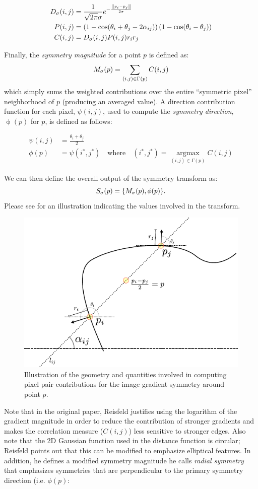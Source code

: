 \begin{align}
D_\sigma(i,j) &= \frac{1}{\sqrt{2\pi}\sigma}e^{-\frac{\left\lVert p_i - p_j \right\rVert}{2\sigma}} \label{eq:dist} \\
P(i,j)        &= \left(1 - \cos(\theta_i + \theta_j - 2\alpha_{ij})\right)\left(1 - \cos(\theta_i - \theta_j)\right) \label{eq:phase}\\
C(i,j)        &= D_\sigma(i,j)P(i,j)r_i r_j \label{eq:cont}
\end{align}

Finally, the \emph{symmetry magnitude} for a point \(p\) is defined as:
\[ M_\sigma(p) = \sum_{(i,j) \in \Gamma(p)} C(i,j) \] which simply sums the weighted contributions over the entire ``symmetric pixel'' neighborhood of \(p\) (producing an averaged value). A direction contribution function for each pixel, \(\psi(i,j)\), used to compute the \emph{symmetry direction}, \(\operatorname{\phi}(p)\) for \(p\), is defined as follows:

\begin{align}
\psi(i,j) &= \frac{\theta_i + \theta_j}{2} \\
\phi(p)   &= \psi(i^*,j^*)\quad\mathrm{where}\quad(i^*,j^*) = \operatorname*{argmax}_{(i,j) \in \Gamma(p)} C(i,j)
\end{align} 

We can then define the overall output of the symmetry transform as:
\[S_\sigma(p) = \{M_\sigma(p), \phi(p)\}.\] Please see  for an illustration indicating the values involved in the transform.

\begin{figure}[ht]
\centering
\includegraphics[width=0.6\linewidth]{figures/pixel_contributions.pdf}
\caption{\label{fig:pixel-contr}
Illustration of the geometry and quantities involved in computing pixel pair contributions for the image gradient symmetry around point \(p\).}
\end{figure}

Note that in the original paper, Reisfeld justifies using the logarithm of the gradient magnitude in order to reduce the contribution of stronger gradients and makes the correlation measure (\(C(i,j)\)) less sensitive to stronger edges. Also note that the 2D Gaussian function used in the distance function is circular; Reisfeld points out that this can be modified to emphasize elliptical features. In addition, he defines a modified symmetry magnitude he calls \emph{radial symmetry} that emphasizes symmetries that are perpendicular to the primary symmetry direction (i.e. \(\phi(p)\):

